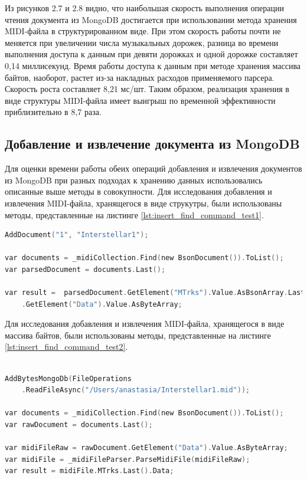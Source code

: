Из рисунков 2.7 и 2.8 видно, что наибольшая скорость выполнения операции чтения документа из MongoDB достигается при использовании метода хранения MIDI-файла в структурированном виде. При этом скорость работы почти не меняется при увеличении числа музыкальных дорожек, разница во времени выполнения доступа к данным при девяти дорожках и одной дорожке составляет 0,14 миллисекунд. Время работы доступа к данным при методе хранения массива байтов, наоборот, растет из-за накладных расходов применяемого парсера. Скорость роста составляет 8,21 мс/шт. Таким образом, реализация хранения в виде структуры MIDI-файла имеет выигрыш по временной эффективности приблизительно в 8,7 раза.

\subsection{Добавление и извлечение документа из MongoDB}

Для оценки времени работы обеих операций добавления и извлечения документов из MongoDB при разных подходах к хранению данных использовались описанные выше методы в совокупности. 
Для исследования добавления и извлечения MIDI-файла, хранящегося в виде струкутры, были использованы методы, представленные на листинге \ref{lst:insert_find_command_test1}. 

\begin{lstlisting}[language=C, label=some-code, caption=Добавление и извлечение MIDI-файла из MongoDB c использованием реализованного метода, label=lst:insert_find_command_test1]
AddDocument("1", "Interstellar1");

var documents = _midiCollection.Find(new BsonDocument()).ToList();
var parsedDocument = documents.Last();

var result =  parsedDocument.GetElement("MTrks").Value.AsBsonArray.Last().AsBsonDocument
    .GetElement("Data").Value.AsByteArray;
\end{lstlisting}

Для исследования добавления и извлечения MIDI-файла, хранящегося в виде массива байтов, были использованы методы, представленные на листинге \ref{lst:insert_find_command_test2}.

\newpage

\begin{lstlisting}[language=C, label=some-code, caption=Добавление и извлечение MIDI-файла из MongoDB в виде массива байтов, label=lst:insert_find_command_test2]

AddBytesMongoDb(FileOperations
    .ReadFileAsync("/Users/anastasia/Interstellar1.mid"));

var documents = _midiCollection.Find(new BsonDocument()).ToList();
var rawDocument = documents.Last();

var midiFileRaw = rawDocument.GetElement("Data").Value.AsByteArray;
var midiFile = _midiFileParser.ParseMidiFile(midiFileRaw);
var result = midiFile.MTrks.Last().Data;
\end{lstlisting}

